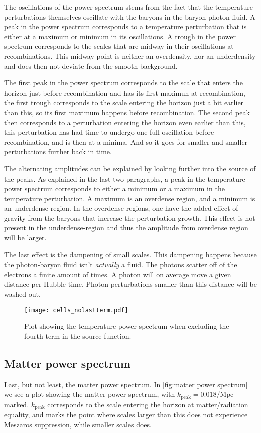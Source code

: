 \documentclass[12pt]{article}
\begin{document}
The oscillations of the power spectrum stems from the fact that the temperature perturbations themselves oscillate with the baryons in the baryon-photon fluid. A peak in the power spectrum corresponds to a temperature perturbation that is either at a maximum or minimum in its oscillations. A trough in the power spectrum corresponds to the scales that are midway in their oscillations at recombinations. This midway-point is neither an overdensity, nor an underdensity and does then not deviate from the smooth background. 

The first peak in the power spectrum corresponds to the scale that enters the horizon just before recombination and has its first maximun at recombination, the first trough corresponds to the scale entering the horizon just a bit earlier than this, so its first maximum happens before recombination. The second peak then corresponds to a perturbation entering the horizon even earlier than this, this perturbation has had time to undergo one full oscillation before recombination, and is then at a minima. And so it goes for smaller and smaller perturbations further back in time.

The alternating amplitudes can be explained by looking further into the source of the peaks. As explained in the last two paragraphs, a peak in the temperature power spectrum corresponds to either a minimum or a maximum in the temperature perturbation. A maximum is an overdense region, and a minimum is an underdense region. In the overdense regions, one have the added effect of gravity from the baryons that increase the perturbation growth. This effect is not present in the underdense-region and thus the amplitude from overdense region will be larger. 

The last effect is the dampening of small scales. This dampening happens because the photon-baryon fluid isn't \textit{actually} a fluid. The photons scatter off of the electrons a finite amount of times. A photon will on average move a given distance per Hubble time. Photon perturbations smaller than this distance will be washed out.


\begin{figure}[h]
    \centering
    \texttt{[image: cells\_nolastterm.pdf]} 
    \caption{Plot showing the temperature power spectrum when excluding the fourth term in the source function.}
    \label{fig:cell no last term}
\end{figure}

\subsection{Matter power spectrum}
Last, but not least, the matter power spectrum. In \cref{fig:matter power spectrum} we see a plot showing the matter power spectrum, with $k_{\mathrm{peak}} = 0.018/\mathrm{Mpc}$ marked. $k_{\mathrm{peak}}$ corresponds to the scale entering the horizon at matter/radiation equality, and marks the point where scales larger than this does not experience Meszaros suppression, while smaller scales does. 
\end{document}
